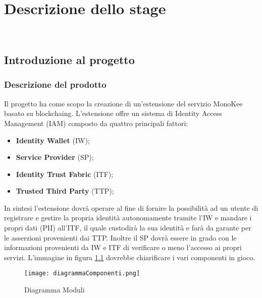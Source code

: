 
\chapter{Descrizione dello stage}
\label{cap:descrizione-stage}

\\

\section{Introduzione al progetto}
\subsection{Descrizione del prodotto}
Il progetto ha come scopo la creazione di un’estensione del servizio MonoKee basato su \gls{blockchaing}. L’estensione offre un sistema di Identity Access Management (IAM) composto da quattro principali fattori:
    \begin{itemize}
        \item \textbf{Identity Wallet} (IW);
        \item \textbf{Service Provider} (SP);
        \item \textbf{Identity Trust Fabric} (ITF);
        \item \textbf{Trusted Third Party} (TTP);
    \end{itemize} 
In sintesi l’estensione dovrà operare al fine di fornire la possibilità ad un utente di registrare e gestire la propria identità autonomamente tramite l’IW e mandare i propri dati (PII) all’ITF, il quale custodirà la sua identità e farà da garante per le asserzioni provenienti dai TTP. Inoltre il SP dovrà essere in grado con le informazioni provenienti da IW e ITF di verificare o meno l’accesso ai propri servizi.
L'immagine in figura \ref{fig:diag-mod} dovrebbe chiarificare i vari componenti in gioco.
\begin{figure}[!h]
    \centering
    \texttt{[image: diagrammaComponenti.png]} 
    \caption{Diagramma Moduli}
    \label{fig:diag-mod} 
\end{figure}
